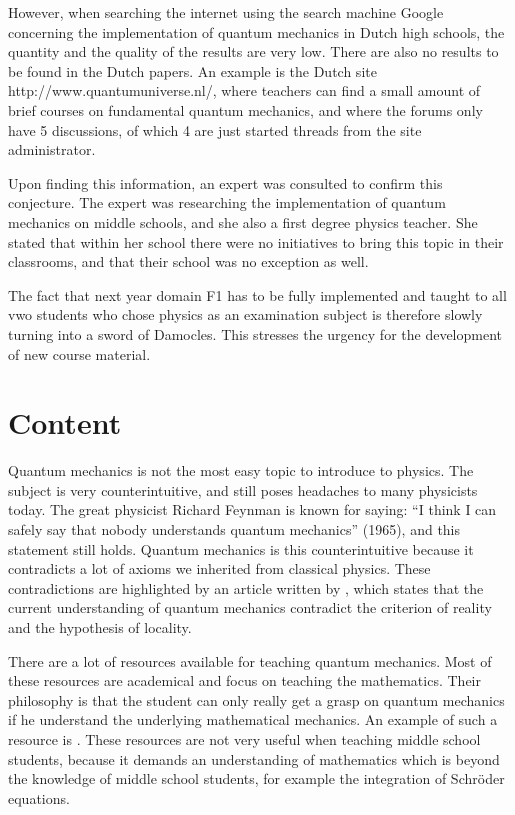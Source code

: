 \documentclass[11pt,twoside]{report} %
\begin{document}
However, when searching the internet using the search machine Google concerning the implementation of quantum mechanics in Dutch high schools, the quantity and the quality of the results are very low. There are also no results to be found in the Dutch papers. An example is the Dutch site http://www.quantumuniverse.nl/, where teachers can find a small amount of brief courses on fundamental quantum mechanics, and where the forums only have 5 discussions, of which 4 are just started threads from the site administrator.

Upon finding this information, an expert was consulted to confirm this conjecture. The expert was researching the implementation of quantum mechanics on middle schools, and she also a first degree physics teacher. She stated that within her school there were no initiatives to bring this topic in their classrooms, and that their school was no exception as well.

The fact that next year domain F1 has to be fully implemented and taught to all vwo students who chose physics as an examination subject is therefore slowly turning into a sword of Damocles. This stresses the urgency for the development of new course material.

\chapter{Content}

Quantum mechanics is not the most easy topic to introduce to physics. The subject is very counterintuitive, and still poses headaches to many physicists today. The great physicist Richard Feynman is known for saying: “I think I can safely say that nobody understands quantum mechanics” (1965), and this statement still holds. Quantum mechanics is this counterintuitive because it contradicts a lot of axioms we inherited from classical physics. These contradictions are highlighted by an article written by , which states that the current understanding of quantum mechanics contradict the criterion of reality and the hypothesis of locality.

There are a lot of resources available for teaching quantum mechanics. Most of these resources are academical and focus on teaching the mathematics. Their philosophy is that the student can only really get a grasp on quantum mechanics if he understand the underlying mathematical mechanics. An example of such a resource is . These resources are not very useful when teaching middle school students, because it demands an understanding of mathematics which is beyond the knowledge of middle school students, for example the integration of Schröder equations.
\end{document}
